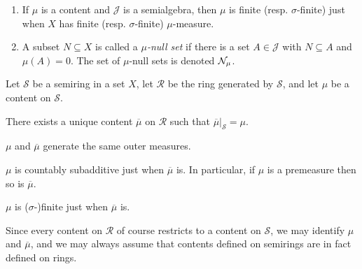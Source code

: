 \documentclass[article, a4paper, 11pt, oneside]{memoir}
\numberwithin{equation}{chapter}
\newcommand{\calR}{\mathcal{R}}
\newcommand{\calS}{\mathcal{S}}
\newcommand{\calJ}{\mathcal{J}}
\begin{document}
\begin{remarkbreak}
\begin{enumerate}
    \item If $\mu$ is a content and $\calJ$ is a semialgebra, then $\mu$ is finite (resp. $\sigma$-finite) just when $X$ has finite (resp. $\sigma$-finite) $\mu$-measure.

    \item A subset $N \subseteq X$ is called a \emph{$\mu$-null set} if there is a set $A \in \calJ$ with $N \subseteq A$ and $\mu(A) = 0$. The set of $\mu$-null sets is denoted $\mathcal{N}_\mu$.
\end{enumerate}
\end{remarkbreak}


\begin{lemma}
    Let $\calS$ be a semiring in a set $X$, let $\calR$ be the ring generated by $\calS$, and let $\mu$ be a content on $\calS$.
    \begin{enumlem}
        \item There exists a unique content $\overline{\mu}$ on $\calR$ such that $\overline{\mu}|_\calS = \mu$.
        
        \item $\mu$ and $\overline{\mu}$ generate the same outer measures.
        
        \item $\mu$ is countably subadditive just when $\overline{\mu}$ is. In particular, if $\mu$ is a premeasure then so is $\overline{\mu}$.

        \item $\mu$ is ($\sigma$-)finite just when $\overline{\mu}$ is.
    \end{enumlem}
\end{lemma}
%
Since every content on $\calR$ of course restricts to a content on $\calS$, we may identify $\mu$ and $\overline{\mu}$, and we may always assume that contents defined on semirings are in fact defined on rings.
\end{document}
